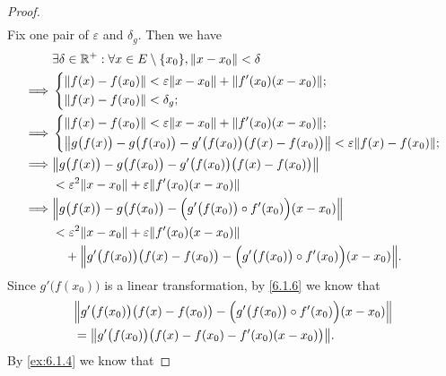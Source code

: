 \begin{proof}
\begin{align*}
  \end{align*}
  Fix one pair of \(\varepsilon\) and \(\delta_g\).
  Then we have
  \begin{align*}
             & \exists \delta \in \R^+ : \forall x \in E \setminus \{x_0\}, \norm*{x - x_0} < \delta                                        \\
    \implies & \begin{dcases}
                 \norm*{f(x) - f(x_0)} < \varepsilon \norm*{x - x_0} + \norm*{f'(x_0)(x - x_0)}; \\
                 \norm*{f(x) - f(x_0)} < \delta_g;
               \end{dcases}                                              \\
    \implies & \begin{dcases}
                 \norm*{f(x) - f(x_0)} < \varepsilon \norm*{x - x_0} + \norm*{f'(x_0)(x - x_0)}; \\
                 \norm*{g\big(f(x)\big) - g\big(f(x_0)\big) - g'\big(f(x_0)\big) \big(f(x) - f(x_0)\big)} < \varepsilon \norm*{f(x) - f(x_0)};
               \end{dcases} \\
    \implies & \norm*{g\big(f(x)\big) - g\big(f(x_0)\big) - g'\big(f(x_0)\big) \big(f(x) - f(x_0)\big)}                                     \\
             & < \varepsilon^2 \norm*{x - x_0} + \varepsilon \norm*{f'(x_0)(x - x_0)}                                                       \\
    \implies & \norm*{g\big(f(x)\big) - g\big(f(x_0)\big) - \Big(g'\big(f(x_0)\big) \circ f'(x_0)\Big) (x - x_0)}                           \\
             & < \varepsilon^2 \norm*{x - x_0} + \varepsilon \norm*{f'(x_0)(x - x_0)}                                                       \\
             & \quad + \norm*{g'\big(f(x_0)\big) \big(f(x) - f(x_0)\big) - \Big(g'\big(f(x_0)\big) \circ f'(x_0)\Big) (x - x_0)}.
  \end{align*}
  Since \(g'\big(f(x_0)\big)\) is a linear transformation, by \cref{6.1.6} we know that
  \begin{align*}
     & \norm*{g'\big(f(x_0)\big) \big(f(x) - f(x_0)\big) - \Big(g'\big(f(x_0)\big) \circ f'(x_0)\Big) (x - x_0)} \\
     & = \norm*{g'\big(f(x_0)\big) \big(f(x) - f(x_0) - f'(x_0) (x - x_0)\big)}.
  \end{align*}
  By \cref{ex:6.1.4} we know that

\end{proof}
